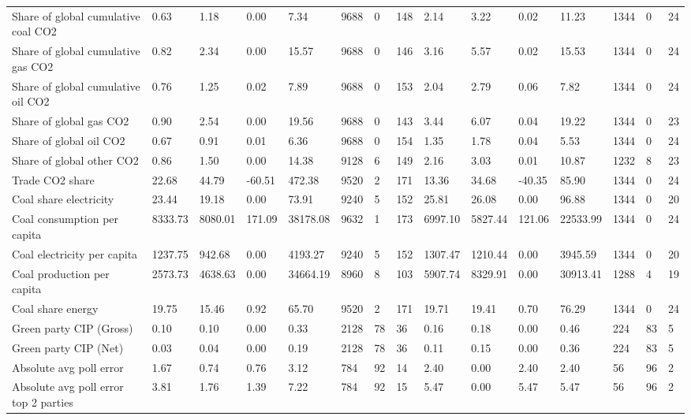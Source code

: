 \begin{longtable}{lllllllllllllll}
Share of global cumulative coal CO2 & 0.63 & 1.18 & 0.00 & 7.34 & 9688 & 0 & 148 & 2.14 & 3.22 & 0.02 & 11.23 & 1344 & 0 & 24\\
Share of global cumulative gas CO2 & 0.82 & 2.34 & 0.00 & 15.57 & 9688 & 0 & 146 & 3.16 & 5.57 & 0.02 & 15.53 & 1344 & 0 & 24\\
\addlinespace
Share of global cumulative oil CO2 & 0.76 & 1.25 & 0.02 & 7.89 & 9688 & 0 & 153 & 2.04 & 2.79 & 0.06 & 7.82 & 1344 & 0 & 24\\
Share of global gas CO2 & 0.90 & 2.54 & 0.00 & 19.56 & 9688 & 0 & 143 & 3.44 & 6.07 & 0.04 & 19.22 & 1344 & 0 & 23\\
Share of global oil CO2 & 0.67 & 0.91 & 0.01 & 6.36 & 9688 & 0 & 154 & 1.35 & 1.78 & 0.04 & 5.53 & 1344 & 0 & 24\\
Share of global other CO2 & 0.86 & 1.50 & 0.00 & 14.38 & 9128 & 6 & 149 & 2.16 & 3.03 & 0.01 & 10.87 & 1232 & 8 & 23\\
Trade CO2 share & 22.68 & 44.79 & -60.51 & 472.38 & 9520 & 2 & 171 & 13.36 & 34.68 & -40.35 & 85.90 & 1344 & 0 & 24\\
\addlinespace
Coal share electricity & 23.44 & 19.18 & 0.00 & 73.91 & 9240 & 5 & 152 & 25.81 & 26.08 & 0.00 & 96.88 & 1344 & 0 & 20\\
Coal consumption per capita & 8333.73 & 8080.01 & 171.09 & 38178.08 & 9632 & 1 & 173 & 6997.10 & 5827.44 & 121.06 & 22533.99 & 1344 & 0 & 24\\
Coal electricity per capita & 1237.75 & 942.68 & 0.00 & 4193.27 & 9240 & 5 & 152 & 1307.47 & 1210.44 & 0.00 & 3945.59 & 1344 & 0 & 20\\
Coal production per capita & 2573.73 & 4638.63 & 0.00 & 34664.19 & 8960 & 8 & 103 & 5907.74 & 8329.91 & 0.00 & 30913.41 & 1288 & 4 & 19\\
Coal share energy & 19.75 & 15.46 & 0.92 & 65.70 & 9520 & 2 & 171 & 19.71 & 19.41 & 0.70 & 76.29 & 1344 & 0 & 24\\
\addlinespace
Green party CIP (Gross) & 0.10 & 0.10 & 0.00 & 0.33 & 2128 & 78 & 36 & 0.16 & 0.18 & 0.00 & 0.46 & 224 & 83 & 5\\
Green party CIP (Net) & 0.03 & 0.04 & 0.00 & 0.19 & 2128 & 78 & 36 & 0.11 & 0.15 & 0.00 & 0.36 & 224 & 83 & 5\\
Absolute avg poll error & 1.67 & 0.74 & 0.76 & 3.12 & 784 & 92 & 14 & 2.40 & 0.00 & 2.40 & 2.40 & 56 & 96 & 2\\
Absolute avg poll error top 2 parties & 3.81 & 1.76 & 1.39 & 7.22 & 784 & 92 & 15 & 5.47 & 0.00 & 5.47 & 5.47 & 56 & 96 & 2\\

\end{longtable}
